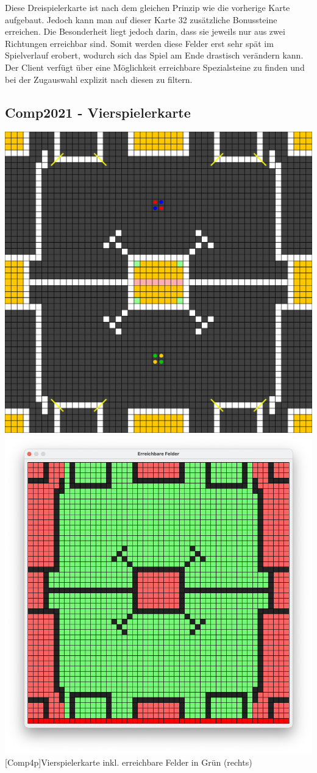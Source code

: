 Diese Dreispielerkarte ist nach dem gleichen Prinzip wie die vorherige Karte aufgebaut.
Jedoch kann man auf dieser Karte 32 zus\"atzliche Bonussteine erreichen.
Die Besonderheit liegt jedoch darin, dass sie jeweils nur aus zwei Richtungen erreichbar sind.
Somit werden diese Felder erst sehr sp\"at im Spielverlauf erobert, wodurch sich das Spiel am Ende drastisch ver\"andern kann.
Der Client verf\"ugt \"uber eine M\"oglichkeit erreichbare Spezialsteine zu finden und bei der Zugauswahl explizit nach diesen zu filtern.

\subsection{Comp2021 - Vierspielerkarte}\label{subsec:comp2021-4p}

\vspace{1em}
\begin{minipage}{\linewidth}
    \centering
    \includegraphics[width=0.49\linewidth]{pics/maps/comp2021_01_4p}
    \includegraphics[width=0.48\linewidth]{pics/maps/field2021_01_4p}
    [Comp4p]{Vierspielerkarte inkl. erreichbare Felder in Gr\"un (rechts)}
    \label{fig:comp-4p}
\end{minipage}
\vspace{1em}

